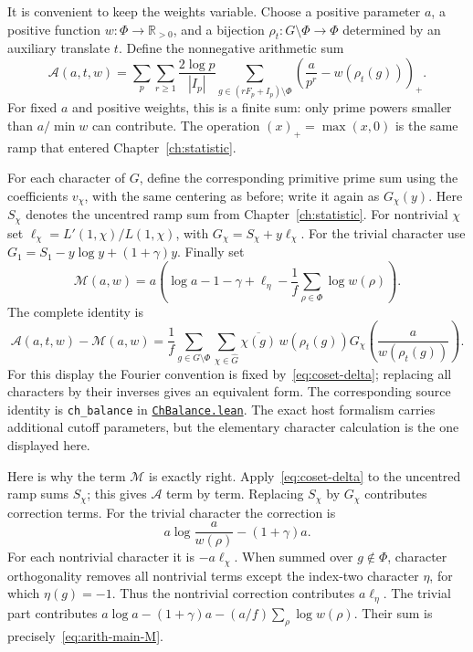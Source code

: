 \documentclass[11pt,openany,oneside]{scrbook}
\theoremstyle{definition}
\theoremstyle{remark}
\newcommand{\RR}{\mathbb R}
\newcommand{\baseurl}{https://github.com/CocoSgt/riemann-hypothesis-lean/blob/7cbf7a0c32fca1badf05931879a37c3f8a2b03b4/}
\newcommand{\sourcefile}[2]{\href{\baseurl#1}{\texttt{#2}}}
\begin{document}
It is convenient to keep the weights variable.  Choose a positive parameter $a$, a positive function $w:\Phi\to\RR_{>0}$, and a bijection $\rho_t:G\setminus\Phi\to\Phi$ determined by an auxiliary translate $t$.  Define the nonnegative arithmetic sum
\begin{equation}\label{eq:finite-gain-A}
\mathcal A(a,t,w)=\sum_{p}\sum_{r\ge1}\frac{2\log p}{|I_p|}
\sum_{g\in(rF_p+I_p)\setminus\Phi}
\left(\frac{a}{p^r}-w(\rho_t(g))\right)_+.
\end{equation}
For fixed $a$ and positive weights, this is a finite sum: only prime powers smaller than $a/\min w$ can contribute.  The operation $(x)_+=\max(x,0)$ is the same ramp that entered Chapter~\ref{ch:statistic}.

For each character of $G$, define the corresponding primitive prime sum using the coefficients $v_\chi$, with the same centering as before; write it again as $G_\chi(y)$. Here $S_\chi$ denotes the uncentred ramp sum from Chapter~\ref{ch:statistic}.  For nontrivial $\chi$ set $\ell_\chi=L'(1,\chi)/L(1,\chi)$, with $G_\chi=S_\chi+y\ell_\chi$.  For the trivial character use $G_1=S_1-y\log y+(1+\gamma)y$.  Finally set
\begin{equation}\label{eq:arith-main-M}
\mathcal M(a,w)=a\left(\log a-1-\gamma+\ell_\eta
-\frac1f\sum_{\rho\in\Phi}\log w(\rho)\right).
\end{equation}
The complete identity is
\begin{equation}\label{eq:balance-exact}
\boxed{\displaystyle
\mathcal A(a,t,w)-\mathcal M(a,w)
=\frac1f\sum_{g\in G\setminus\Phi}\sum_{\chi\in\widehat G}
\overline{\chi(g)}\,w(\rho_t(g))
G_\chi\left(\frac{a}{w(\rho_t(g))}\right).}
\end{equation}
For this display the Fourier convention is fixed by~\eqref{eq:coset-delta}; replacing all characters by their inverses gives an equivalent form.  The corresponding source identity is \texttt{ch\_balance} in
\sourcefile{src/Development/AutomorphicArithmetic/DedekindLFunctions/LandauTheorems/ChBalance.lean}{ChBalance.lean}.  The exact host formalism carries additional cutoff parameters, but the elementary character calculation is the one displayed here.

Here is why the term $\mathcal M$ is exactly right.  Apply~\eqref{eq:coset-delta} to the uncentred ramp sums $S_\chi$; this gives $\mathcal A$ term by term.  Replacing $S_\chi$ by $G_\chi$ contributes correction terms.  For the trivial character the correction is
\[
a\log\frac{a}{w(\rho)}-(1+\gamma)a.
\]
For each nontrivial character it is $-a\ell_\chi$.  When summed over $g\notin\Phi$, character orthogonality removes all nontrivial terms except the index-two character $\eta$, for which $\eta(g)=-1$.  Thus the nontrivial correction contributes $a\ell_\eta$.  The trivial part contributes $a\log a-(1+\gamma)a-(a/f)\sum_\rho\log w(\rho)$.  Their sum is precisely~\eqref{eq:arith-main-M}.
\end{document}
